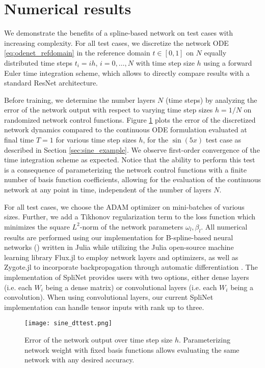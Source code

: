 \documentclass[12pt]{amsart}
\begin{document}
\section{Numerical results}
\label{sec:numerical}
We demonstrate the benefits of a spline-based network on test cases with increasing complexity.
For all test cases, we discretize the network ODE \eqref{eq:odenet_refdomain} in the reference domain $t\in[0,1]$ on $N$ equally distributed time steps $t_i = ih$, $i=0,\dots,N$ with time step size $h$ using a forward Euler time integration scheme, which allows to directly compare results with a standard ResNet architecture.

Before training, we determine the number layers $N$ (time steps) by analyzing the error of the network output with respect to varying time step sizes $h = 1/N$ on randomized network control functions. Figure \ref{fig:sine_dttest} plots the error of the discretized network dynamics compared to the continuous ODE formulation evaluated at final time $T=1$ for various time step sizes $h$, for the $\sin(5x)$ test case as described in Section \ref{sec:sine_example}. We observe first-order convergence of the time integration scheme as expected. Notice that the ability to perform this test is a consequence of parameterizing the network control functions with a finite number of basis function coefficients, allowing for the evaluation of the continuous network at any point in time, independent of the number of layers $N$.

For all test cases, we choose the ADAM optimizer on mini-batches of various sizes. Further, we add a Tikhonov regularization term to the loss function which minimizes the square $L^2$-norm of the network parameters $\omega_l, \beta_l$.
All numerical results are performed using our implementation for B-spline-based neural networks (\cite{splinemlGithub}) written in Julia while utilizing the Julia open-source machine learning library Flux.jl to employ network layers and optimizers, as well as Zygote.jl to incorporate backpropagation through automatic differentiation \cite{innes2018don}.
The implementation of SpliNet provides users with two options, either dense layers (i.e. each $W_i$ being a dense matrix) or convolutional layers (i.e. each $W_i$ being a convolution).
When using convolutional layers, our current SpliNet implementation can handle tensor inputs with rank up to three.

\begin{figure}
    \centering
    \texttt{[image: sine\_dttest.png]}
    \caption{Error of the network output over time step size $h$. Parameterizing network weight with fixed basis functions allows evaluating the same network with any desired accuracy.}
    \label{fig:sine_dttest}
\end{figure}
\end{document}

